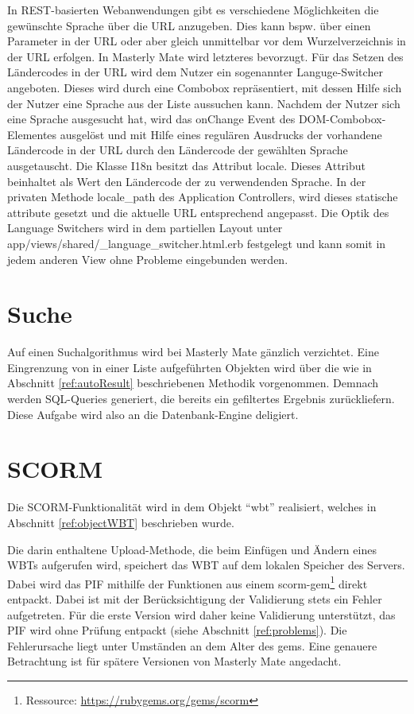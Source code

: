 In REST-basierten Webanwendungen gibt es verschiedene Möglichkeiten die
gewünschte Sprache über die URL anzugeben. Dies kann bspw. über einen Parameter in der URL oder
aber gleich unmittelbar vor dem Wurzelverzeichnis in der URL erfolgen. In
Masterly Mate wird letzteres bevorzugt. Für das Setzen des Ländercodes in der
URL wird dem Nutzer ein sogenannter Languge-Switcher angeboten. Dieses wird
durch eine Combobox repräsentiert, mit dessen Hilfe sich der Nutzer eine Sprache
aus der Liste aussuchen kann. Nachdem der Nutzer sich eine Sprache ausgesucht
hat, wird das onChange Event des DOM-Combobox-Elementes ausgelöst und mit Hilfe
eines regulären Ausdrucks der vorhandene Ländercode in der URL durch den
Ländercode der gewählten Sprache ausgetauscht. Die Klasse I18n besitzt das
Attribut locale. Dieses Attribut beinhaltet als Wert den Ländercode der zu
verwendenden Sprache. In der privaten Methode locale\_path des Application
Controllers, wird dieses statische attribute gesetzt und die aktuelle URL
entsprechend angepasst. Die Optik des Language Switchers wird in dem partiellen
Layout unter app/views/shared/\_language\_switcher.html.erb festgelegt und kann
somit in jedem anderen View ohne Probleme eingebunden werden.

\section{Suche}
Auf einen Suchalgorithmus wird bei Masterly Mate gänzlich verzichtet. Eine
Eingrenzung von in einer Liste aufgeführten Objekten wird über die wie in
Abschnitt \ref{ref:autoResult} beschriebenen Methodik vorgenommen. Demnach
werden \ac{SQL}-Queries generiert, die bereits ein gefiltertes Ergebnis
zurückliefern. Diese Aufgabe wird also an die Datenbank-Engine deligiert.

\section{SCORM}\label{ref:implSCORM}
Die SCORM-Funktionalität wird in dem Objekt "`wbt"' realisiert, welches in
Abschnitt \ref{ref:objectWBT} beschrieben wurde. 

Die darin enthaltene Upload-Methode, die beim Einfügen und Ändern eines WBTs
aufgerufen wird, speichert das WBT auf dem lokalen Speicher des Servers. Dabei
wird das \ac{PIF} mithilfe der Funktionen aus einem
scorm-gem\footnote{Ressource: \url{https://rubygems.org/gems/scorm}} direkt
entpackt. Dabei ist mit der Berücksichtigung der Validierung stets ein Fehler
aufgetreten. Für die erste Version wird daher keine Validierung unterstützt, das
PIF wird ohne Prüfung entpackt (siehe Abschnitt \ref{ref:problems}). Die
Fehlerursache liegt unter Umständen an dem Alter des gems. Eine genauere Betrachtung ist für
spätere Versionen von Masterly Mate angedacht. 

